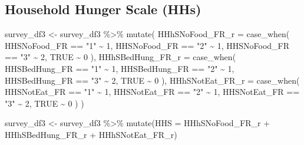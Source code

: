 \documentclass[
  letterpaper,
  DIV=11,
  numbers=noendperiod]{scrreprt}
\newenvironment{Shaded}{\begin{snugshade}}{\end{snugshade}}
\newcommand{\AttributeTok}[1]{\textcolor[rgb]{0.40,0.45,0.13}{#1}}
\newcommand{\ConstantTok}[1]{\textcolor[rgb]{0.56,0.35,0.01}{#1}}
\newcommand{\DecValTok}[1]{\textcolor[rgb]{0.68,0.00,0.00}{#1}}
\newcommand{\FunctionTok}[1]{\textcolor[rgb]{0.28,0.35,0.67}{#1}}
\newcommand{\NormalTok}[1]{\textcolor[rgb]{0.00,0.23,0.31}{#1}}
\newcommand{\OtherTok}[1]{\textcolor[rgb]{0.00,0.23,0.31}{#1}}
\newcommand{\SpecialCharTok}[1]{\textcolor[rgb]{0.37,0.37,0.37}{#1}}
\newcommand{\StringTok}[1]{\textcolor[rgb]{0.13,0.47,0.30}{#1}}
\begin{document}
\hypertarget{household-hunger-scale-hhs}{%
\subsection{Household Hunger Scale
(HHs)}\label{household-hunger-scale-hhs}}

\begin{Shaded}
\begin{Highlighting}[]
\NormalTok{survey\_df3 }\OtherTok{\textless{}{-}}\NormalTok{ survey\_df3 }\SpecialCharTok{\%\textgreater{}\%}
  \FunctionTok{mutate}\NormalTok{(}
    \AttributeTok{HHhSNoFood\_FR\_r =} \FunctionTok{case\_when}\NormalTok{(}
\NormalTok{      HHSNoFood\_FR }\SpecialCharTok{==} \StringTok{"1"} \SpecialCharTok{\textasciitilde{}} \DecValTok{1}\NormalTok{,}
\NormalTok{      HHSNoFood\_FR }\SpecialCharTok{==} \StringTok{"2"} \SpecialCharTok{\textasciitilde{}} \DecValTok{1}\NormalTok{,}
\NormalTok{      HHSNoFood\_FR }\SpecialCharTok{==} \StringTok{"3"} \SpecialCharTok{\textasciitilde{}} \DecValTok{2}\NormalTok{,}
      \ConstantTok{TRUE} \SpecialCharTok{\textasciitilde{}} \DecValTok{0}
\NormalTok{    ),}
    \AttributeTok{HHhSBedHung\_FR\_r =} \FunctionTok{case\_when}\NormalTok{(}
\NormalTok{      HHSBedHung\_FR }\SpecialCharTok{==} \StringTok{"1"} \SpecialCharTok{\textasciitilde{}} \DecValTok{1}\NormalTok{,}
\NormalTok{      HHSBedHung\_FR }\SpecialCharTok{==} \StringTok{"2"} \SpecialCharTok{\textasciitilde{}} \DecValTok{1}\NormalTok{,}
\NormalTok{      HHSBedHung\_FR }\SpecialCharTok{==} \StringTok{"3"} \SpecialCharTok{\textasciitilde{}} \DecValTok{2}\NormalTok{,}
      \ConstantTok{TRUE} \SpecialCharTok{\textasciitilde{}} \DecValTok{0}
\NormalTok{    ),}
    \AttributeTok{HHhSNotEat\_FR\_r =} \FunctionTok{case\_when}\NormalTok{(}
\NormalTok{      HHSNotEat\_FR }\SpecialCharTok{==} \StringTok{"1"} \SpecialCharTok{\textasciitilde{}} \DecValTok{1}\NormalTok{,}
\NormalTok{      HHSNotEat\_FR }\SpecialCharTok{==} \StringTok{"2"} \SpecialCharTok{\textasciitilde{}} \DecValTok{1}\NormalTok{,}
\NormalTok{      HHSNotEat\_FR }\SpecialCharTok{==} \StringTok{"3"} \SpecialCharTok{\textasciitilde{}} \DecValTok{2}\NormalTok{,}
      \ConstantTok{TRUE} \SpecialCharTok{\textasciitilde{}} \DecValTok{0}
\NormalTok{    )}
\NormalTok{  )}

\NormalTok{survey\_df3 }\OtherTok{\textless{}{-}}\NormalTok{ survey\_df3 }\SpecialCharTok{\%\textgreater{}\%}
  \FunctionTok{mutate}\NormalTok{(}\AttributeTok{HHS =}\NormalTok{ HHhSNoFood\_FR\_r }\SpecialCharTok{+}\NormalTok{ HHhSBedHung\_FR\_r }\SpecialCharTok{+}\NormalTok{ HHhSNotEat\_FR\_r)}


\end{Highlighting}
\end{Shaded}
\end{document}
